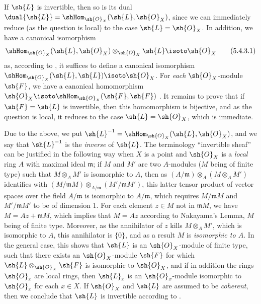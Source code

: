 \begin{env}[5.4.3]
\label{0.5.4.3}
If $\sh{L}$ is invertible, then so is its dual $\dual{\sh{L}}=\shHom_{\sh{O}_X}(\sh{L},\sh{O}_X)$, since we can immediately reduce (as the question is local) to the case $\sh{L}=\sh{O}_X$.
In addition, we have a canonical isomorphism
\[
  \shHom_{\sh{O}_X}(\sh{L},\sh{O}_X)\otimes_{\sh{O}_X}\sh{L}\isoto\sh{O}_X
  \tag{5.4.3.1}
\]
as, according to , it suffices to define a canonical isomorphism $\shHom_{\sh{O}_X}(\sh{L},\sh{L})\isoto\sh{O}_X$.
For \emph{each} $\sh{O}_X$-module $\sh{F}$, we have a canonical homomorphism $\sh{O}_X\isoto\shHom_{\sh{O}_X}(\sh{F},\sh{F})$ .
It remains to prove that if $\sh{F}=\sh{L}$ is invertible, then this homomorphism is bijective, and as the question is local, it reduces to the case $\sh{L}=\sh{O}_X$, which is immediate.

Due to the above, we put $\sh{L}^{-1}=\shHom_{\sh{O}_X}(\sh{L},\sh{O}_X)$, and we say that $\sh{L}^{-1}$ is the \emph{inverse} of $\sh{L}$.
The terminology ``invertible sheaf'' can be justified in the following way when $X$ is a point and $\sh{O}_X$ is a \emph{local} ring $A$ with maximal ideal $\mathfrak{m}$;
if $M$ and $M'$ are two $A$-modules ($M$ being of finite type) such that $M\otimes_A M'$ is isomorphic to $A$, then as $(A/\mathfrak{m})\otimes_A(M\otimes_A M')$ identifies with $(M/\mathfrak{m}M)\otimes_{A/\mathfrak{m}}(M'/\mathfrak{m}M')$, this latter tensor product of vector spaces over the field $A/\mathfrak{m}$ is isomorphic to $A/\mathfrak{m}$, which requires $M/\mathfrak{m}M$ and $M'/\mathfrak{m}M'$ to be of dimension $1$.
For each element $z\in M$ not in $\mathfrak{m}M$, we have $M=Az+\mathfrak{m}M$, which implies that $M=Az$ according to Nakayama's Lemma, $M$ being of finite type.
Moreover, as the annihilator of $z$ kills $M\otimes_A M'$, which is isomorphic to $A$, this annihilator is $\{0\}$, and as a result $M$ is \emph{isomorphic to $A$}.
In the general case, this shows that $\sh{L}$ is an $\sh{O}_X$-module of finite type, such that there exists an $\sh{O}_X$-module $\sh{F}$ for which $\sh{L}\otimes_{\sh{O}_X}\sh{F}$ is isomorphic to $\sh{O}_X$, and if in addition the rings $\sh{O}_x$ are local rings, then $\sh{L}_x$ is an $\sh{O}_x$-module isomorphic to $\sh{O}_x$ for each $x\in X$.
If $\sh{O}_X$ and $\sh{L}$ are assumed to be \emph{coherent}, then we conclude that $\sh{L}$ is invertible according to .
\end{env}

